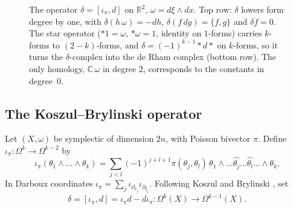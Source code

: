 \documentclass[11pt,oneside,reqno]{article}
\newcommand{\C}{\mathbb C}
\newcommand{\R}{\mathbb R}
\newcommand{\Om}{\Omega}
\newcommand{\pa}{\partial}
\theoremstyle{plain}
\theoremstyle{definition}
\theoremstyle{remark}
\begin{document}
\begin{figure}[htbp]
\centering
{}
\caption[\(\delta\) and \(d\) on the plane]{The operator \(\delta=[\iota_\pi,d]\) on
\(\R^2\), \(\omega=d\xi\wedge dx\). Top row: \(\delta\) lowers form degree by one,
with \(\delta(h\,\omega)=-dh\), \(\delta(f\,dg)=\{f,g\}\) and \(\delta f=0\). The star
operator (\(*1=\omega\), \(*\omega=1\), identity on \(1\)-forms) carries
\(k\)-forms to \((2-k)\)-forms, and \(\delta=(-1)^{k-1}*d*\) on \(k\)-forms, so it turns
the \(\delta\)-complex into the de Rham complex (bottom row). The only homology,
\(\C\,\omega\) in degree \(2\), corresponds to the constants in degree~\(0\).}
\label{fig:deltaR2}
\end{figure}

\subsection{The Koszul--Brylinski operator}\label{subsec:delta}
Let \((X,\omega)\) be symplectic of dimension \(2n\), with Poisson bivector \(\pi\).
Define \(\iota_\pi:\Om^k\to\Om^{k-2}\) by
\[
 \iota_\pi(\theta_1\wedge\dots\wedge\theta_k)=\sum_{j<l}(-1)^{j+l+1}\pi(\theta_j,\theta_l)\,
 \theta_1\wedge\dots\widehat{\theta_j}\dots\widehat{\theta_l}\dots\wedge\theta_k .
\]
In Darboux coordinates \(\iota_\pi=\sum_j\iota_{\pa_{x_j}}\iota_{\pa_{\xi_j}}\). Following
Koszul \cite{Koszul} and Brylinski \cite{Brylinski}, set
\[
 \delta=[\iota_\pi,d]=\iota_\pi d-d\iota_\pi:\Om^k(X)\to\Om^{k-1}(X).
\]
\end{document}
